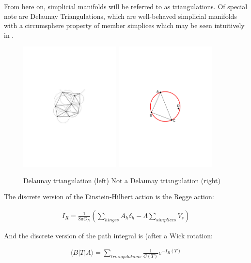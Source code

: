 \documentclass[12pt]{article}
\begin{document}
From here on, simplicial manifolds will be referred to as triangulations. Of special note are Delaunay Triangulations, which are well-behaved simplicial manifolds
with a circumsphere property of member simplices which may be seen intuitively in .

\begin{figure}
  \begin{center}
  \includegraphics[width=2in]{DT1.pdf}
   \includegraphics[width=2in]{NDT.pdf}
  \caption{Delaunay triangulation (left) Not a Delaunay triangulation (right) \label{DT}}
  \end{center}
\end{figure}

The discrete version of the Einstein-Hilbert action is the Regge action:

\begin{align}
  I_{R}=\frac{1}{8\pi G_{N}}\left(\sum\limits_{hinges}A_{h}\delta_{h}-\Lambda\sum\limits_{simplices}V_{s}\right)\label{equation:Regge-Action}
\end{align}

And the discrete version of the path integral is (after a Wick rotation:

\begin{align}
  \langle B|T|A\rangle=\sum\limits_{triangulations}\frac{1}{C(T)}e^{-I_{R}(T)} \label{CDT1}
\end{align}
\end{document}

